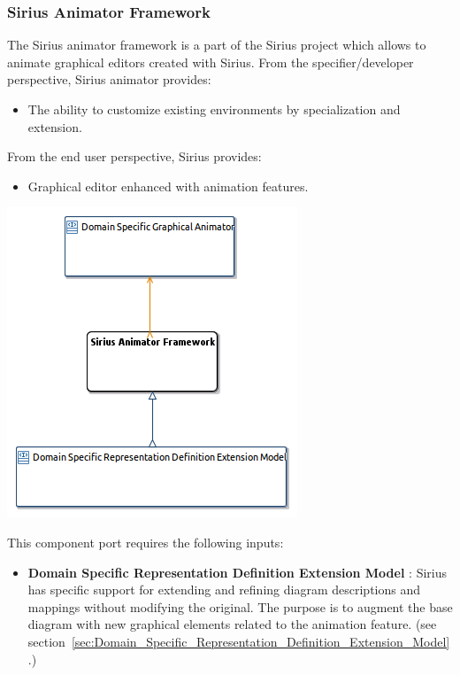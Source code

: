 \documentclass{gemoc} %
\begin{document}
\subsubsection{Sirius Animator Framework}
\label{sec:Sirius_Animator_Framework}

The Sirius animator framework is a part of the Sirius project which allows to animate graphical editors created with Sirius.
From the specifier/developer perspective, Sirius animator provides:
\begin{itemize}
\item The ability to customize existing environments by specialization and extension.
\end{itemize}
From the end user perspective, Sirius provides:
\begin{itemize}
\item Graphical editor enhanced with animation features.
\end{itemize}
\begin{center}
\includegraphics*[trim=0.0cm 0.0cm 0cm 0.0cm, clip=true]{../images/generated/Generated_Sirius_Animator_Framework.png}
\end{center}

This component port requires the following inputs:
\begin{itemize}
  \item \textbf{Domain Specific Representation Definition Extension Model} :
Sirius has specific support for extending and refining diagram descriptions and mappings without modifying the original. The purpose is to augment the base diagram with new graphical elements related to the animation feature.
(see section~\ref{sec:Domain_Specific_Representation_Definition_Extension_Model}.)
\end{itemize}
\end{document}
